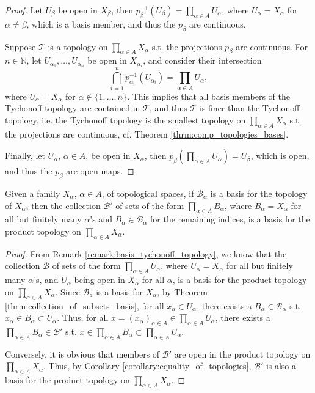 \begin{proof}
	Let $U_{\beta}$ be open in $X_{\beta}$, then $p_{\beta}^{-1}(U_{\beta}) = \prod_{\alpha\in A}U_{\alpha}$, where $U_{\alpha} = X_{\alpha}$ for $\alpha\ne\beta$, which is a basis member, and thus the $p_{\beta}$ are continuous. 
	
	Suppose $\mathscr T$ is a topology on $\prod_{\alpha\in A}X_{\alpha}$ s.t. the projections $p_{\beta}$ are continuous. For $n\in\mathbb N$, let $U_{\alpha_1}, \dots, U_{\alpha_n}$ be open in $X_{\alpha_i}$, and consider their intersection
	$$\bigcap_{i=1}^{n} p_{\alpha_i}^{-1}(U_{\alpha_i}) = \prod_{\alpha\in A}U_{\alpha},$$
	where $U_{\alpha} = X_{\alpha}$ for $\alpha\notin \{1, \dots, n\}$. This implies that all basis members of the Tychonoff topology are contained in $\mathscr T$, and thus $\mathscr T$ is finer than the Tychonoff topology, i.e. the Tychonoff topology is the smallest topology on $\prod_{\alpha\in A}X_{\alpha}$ s.t. the projections are continuous, cf. Theorem \ref{thrm:comp_topologies_bases}.
	
	Finally, let $U_{\alpha}$, $\alpha\in A$, be open in $X_{\alpha}$, then $p_{\beta}(\prod_{\alpha\in A}U_{\alpha}) = U_{\beta}$, which is open, and thus the $p_{\beta}$ are open maps.
\end{proof}

\begin{theorem}
	Given a family $X_{\alpha}$, $\alpha\in A$, of topological spaces, if $\mathscr B_{\alpha}$ is a basis for the topology of $X_{\alpha}$, then the collection $\mathscr B'$ of sets of the form $\prod_{\alpha\in A}B_{\alpha}$, where $B_{\alpha} = X_{\alpha}$ for all but finitely many $\alpha$'s and $B_{\alpha}\in \mathscr B_{\alpha}$ for the remaining indices, is a basis for the product topology on $\prod_{\alpha\in A}X_{\alpha}$.
\end{theorem}

\begin{proof}
	From Remark \ref{remark:basis_tychonoff_topology}, we know that the collection $\mathscr B$ of sets of the form $\prod_{\alpha\in A}U_{\alpha}$, where $U_{\alpha} = X_{\alpha}$ for all but finitely many $\alpha$'s, and $U_{\alpha}$ being open in $X_{\alpha}$ for all $\alpha$, is a basis for the product topology on $\prod_{\alpha\in A}X_{\alpha}$. Since $\mathscr B_a$ is a basis for $X_{\alpha}$, by Theorem \ref{thrm:collection_of_subsets_basis}, for all $x_{\alpha}\in U_{\alpha}$, there exists a $B_{\alpha}\in \mathscr B_{\alpha}$ s.t. $x_{\alpha}\in B_{\alpha}\subset U_{\alpha}$. Thus, for all $x = \left(x_{\alpha}\right)_{\alpha\in A}\in \prod_{\alpha \in A}U_{\alpha}$, there exists a $\prod_{\alpha\in A} B_{\alpha}\in\mathscr B'$ s.t. $x\in \prod_{\alpha\in A}B_{\alpha}\subset \prod_{\alpha\in A}U_{\alpha}$. 
	
	Conversely, it is obvious that members of $\mathscr B'$ are open in the product topology on $\prod_{\alpha\in A}X_{\alpha}$. Thus, by Corollary \ref{corollary:equality_of_topologies}, $\mathscr B'$ is also a basis for the product topology on $\prod_{\alpha\in A}X_{\alpha}$.
\end{proof}

